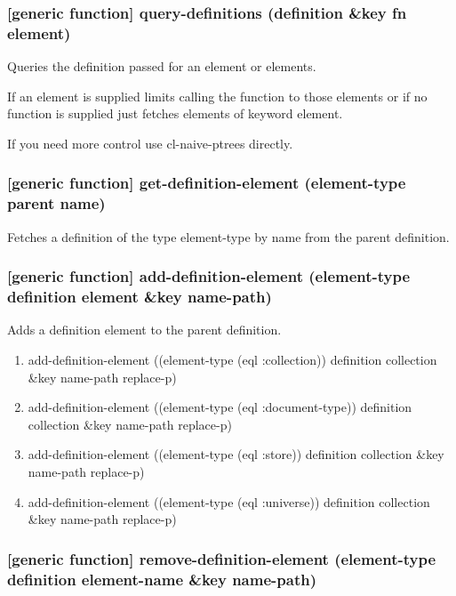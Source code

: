 \documentclass[11pt]{article}
\begin{document}
\subsubsection{[generic function] query-definitions (definition \&key fn element)}
\label{sec:org06f2566}

Queries the definition passed for an element or elements.

If an element is supplied limits calling the function to those elements or if no function is supplied just fetches elements of keyword element.

If you need more control use cl-naive-ptrees directly.

\subsubsection{[generic function] get-definition-element (element-type parent name)}
\label{sec:org18b6212}

Fetches a definition of the type element-type by name from the parent definition.

\subsubsection{[generic function] add-definition-element (element-type definition element \&key name-path)}
\label{sec:orgd04ad25}

Adds a definition element to the parent definition.

\begin{enumerate}
\item add-definition-element ((element-type (eql :collection)) definition collection \&key name-path replace-p)
\label{sec:org2124794}
\item add-definition-element ((element-type (eql :document-type)) definition collection \&key name-path replace-p)
\label{sec:org433e476}
\item add-definition-element ((element-type (eql :store)) definition collection \&key name-path replace-p)
\label{sec:orgb6c4e1d}
\item add-definition-element ((element-type (eql :universe)) definition collection \&key name-path replace-p)
\label{sec:orga27460d}
\end{enumerate}

\subsubsection{[generic function] remove-definition-element (element-type definition element-name \&key name-path)}
\label{sec:orgeb822b4}
\end{document}
